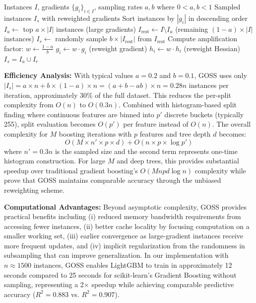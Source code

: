 \documentclass[10pt,twocolumn]{article}
\begin{document}
\begin{algorithm}[H]
\caption{Gradient-Based One-Side Sampling}
\label{alg:goss}
\begin{algorithmic}[1]
\REQUIRE Instances $I$, gradients $\{g_i\}_{i \in I}$, sampling rates $a, b$ where $0 < a, b < 1$
\ENSURE Sampled instances $I_s$ with reweighted gradients
\STATE Sort instances by $|g_i|$ in descending order
\STATE $I_a \gets$ top $a \times |I|$ instances (large gradients)
\STATE $I_{\text{rest}} \gets I \setminus I_a$ (remaining $(1-a) \times |I|$ instances)
\STATE $I_r \gets$ randomly sample $b \times |I_{\text{rest}}|$ from $I_{\text{rest}}$
\STATE Compute amplification factor: $w \gets \frac{1-a}{b}$
    \STATE $g_i \gets w \cdot g_i$ (reweight gradient)
    \STATE $h_i \gets w \cdot h_i$ (reweight Hessian)
\ENDFOR
\RETURN $I_s = I_a \cup I_r$
\end{algorithmic}
\end{algorithm}

\textbf{Efficiency Analysis:} With typical values $a=0.2$ and $b=0.1$, GOSS uses only $|I_s| = a \times n + b \times (1-a) \times n = (a + b - ab) \times n = 0.28n$ instances per iteration, approximately 30\% of the full dataset. This reduces the per-split complexity from $O(n)$ to $O(0.3n)$. Combined with histogram-based split finding where continuous features are binned into $p'$ discrete buckets (typically 255), split evaluation becomes $O(p')$ per feature instead of $O(n)$. The overall complexity for $M$ boosting iterations with $p$ features and tree depth $d$ becomes:
\begin{equation}
O(M \times n' \times p \times d) + O(n \times p \times \log p')
\end{equation}
where $n' = 0.3n$ is the sampled size and the second term represents one-time histogram construction. For large $M$ and deep trees, this provides substantial speedup over traditional gradient boosting's $O(Mnpd\log n)$ complexity while \cite{ke2017lightgbm} prove that GOSS maintains comparable accuracy through the unbiased reweighting scheme.

\textbf{Computational Advantages:} Beyond asymptotic complexity, GOSS provides practical benefits including (i) reduced memory bandwidth requirements from accessing fewer instances, (ii) better cache locality by focusing computation on a smaller working set, (iii) earlier convergence as large-gradient instances receive more frequent updates, and (iv) implicit regularization from the randomness in subsampling that can improve generalization. In our implementation with $n \approx 1500$ instances, GOSS enables LightGBM to train in approximately 12 seconds compared to 25 seconds for scikit-learn's Gradient Boosting without sampling, representing a 2$\times$ speedup while achieving comparable predictive accuracy ($R^2 = 0.883$ vs. $R^2 = 0.907$).
\end{document}
